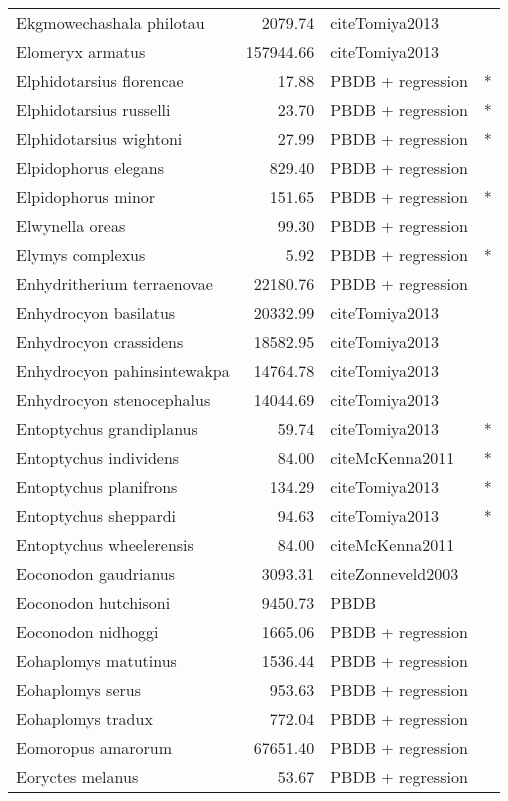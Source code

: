 \begin{table}[ht]
\begin{tabular}{lrll}
  Ekgmowechashala philotau & 2079.74 & cite{Tomiya2013} &  \\ 
  Elomeryx armatus & 157944.66 & cite{Tomiya2013} &  \\ 
  Elphidotarsius florencae & 17.88 & PBDB + regression & * \\ 
  Elphidotarsius russelli & 23.70 & PBDB + regression & * \\ 
  Elphidotarsius wightoni & 27.99 & PBDB + regression & * \\ 
  Elpidophorus elegans & 829.40 & PBDB + regression &  \\ 
  Elpidophorus minor & 151.65 & PBDB + regression & * \\ 
  Elwynella oreas & 99.30 & PBDB + regression &  \\ 
  Elymys complexus & 5.92 & PBDB + regression & * \\ 
  Enhydritherium terraenovae & 22180.76 & PBDB + regression &  \\ 
  Enhydrocyon basilatus & 20332.99 & cite{Tomiya2013} &  \\ 
  Enhydrocyon crassidens & 18582.95 & cite{Tomiya2013} &  \\ 
  Enhydrocyon pahinsintewakpa & 14764.78 & cite{Tomiya2013} &  \\ 
  Enhydrocyon stenocephalus & 14044.69 & cite{Tomiya2013} &  \\ 
  Entoptychus grandiplanus & 59.74 & cite{Tomiya2013} & * \\ 
  Entoptychus individens & 84.00 & cite{McKenna2011} & * \\ 
  Entoptychus planifrons & 134.29 & cite{Tomiya2013} & * \\ 
  Entoptychus sheppardi & 94.63 & cite{Tomiya2013} & * \\ 
  Entoptychus wheelerensis & 84.00 & cite{McKenna2011} &  \\ 
  Eoconodon gaudrianus & 3093.31 & cite{Zonneveld2003} &  \\ 
  Eoconodon hutchisoni & 9450.73 & PBDB &  \\ 
  Eoconodon nidhoggi & 1665.06 & PBDB + regression &  \\ 
  Eohaplomys matutinus & 1536.44 & PBDB + regression &  \\ 
  Eohaplomys serus & 953.63 & PBDB + regression &  \\ 
  Eohaplomys tradux & 772.04 & PBDB + regression &  \\ 
  Eomoropus amarorum & 67651.40 & PBDB + regression &  \\ 
  Eoryctes melanus & 53.67 & PBDB + regression &  \\ 

\end{tabular}
\end{table}
